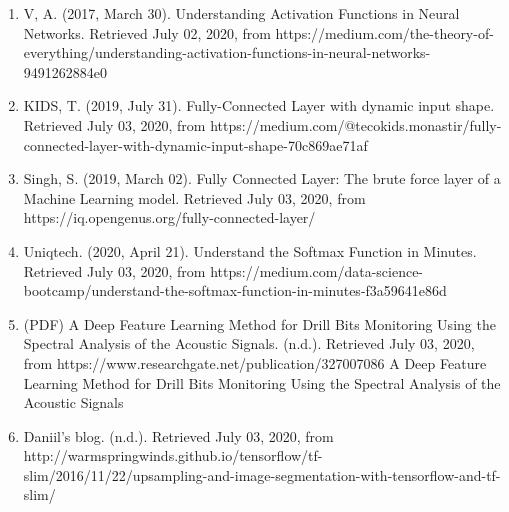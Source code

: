 \documentclass{IEEEtran}
\begin{document}
\begin{enumerate}
\item V, A. (2017, March 30). Understanding Activation Functions in Neural Networks. Retrieved July 02, 2020, from https://medium.com/the-theory-of-everything/understanding-activation-functions-in-neural-networks-9491262884e0

\item KIDS, T. (2019, July 31). Fully-Connected Layer with dynamic input shape. Retrieved July 03, 2020, from https://medium.com/@tecokids.monastir/fully-connected-layer-with-dynamic-input-shape-70c869ae71af

\item Singh, S. (2019, March 02). Fully Connected Layer: The brute force layer of a Machine Learning model. Retrieved July 03, 2020, from https://iq.opengenus.org/fully-connected-layer/

\item Uniqtech. (2020, April 21). Understand the Softmax Function in Minutes. Retrieved July 03, 2020, from https://medium.com/data-science-bootcamp/understand-the-softmax-function-in-minutes-f3a59641e86d

\item (PDF) A Deep Feature Learning Method for Drill Bits Monitoring Using the Spectral Analysis of the Acoustic Signals. (n.d.). Retrieved July 03, 2020, from https://www.researchgate.net/publication/327007086 A Deep Feature Learning Method for Drill Bits Monitoring Using the Spectral Analysis of the Acoustic Signals

\item Daniil's blog. (n.d.). Retrieved July 03, 2020, from http://warmspringwinds.github.io/tensorflow/tf-slim/2016/11/22/upsampling-and-image-segmentation-with-tensorflow-and-tf-slim/
\end{enumerate}
\end{document}
